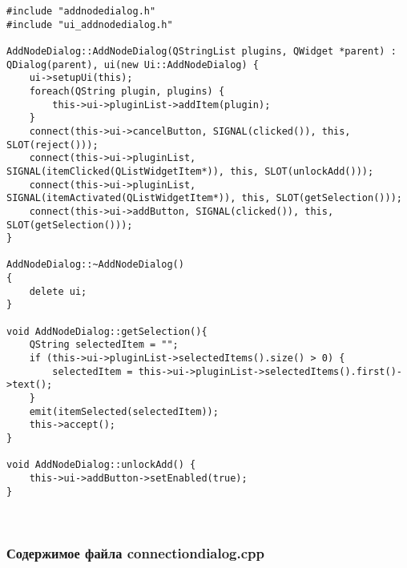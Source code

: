 \begin{lstlisting}
#include "addnodedialog.h"
#include "ui_addnodedialog.h"

AddNodeDialog::AddNodeDialog(QStringList plugins, QWidget *parent) : QDialog(parent), ui(new Ui::AddNodeDialog) {
    ui->setupUi(this);
    foreach(QString plugin, plugins) {
        this->ui->pluginList->addItem(plugin);
    }
    connect(this->ui->cancelButton, SIGNAL(clicked()), this, SLOT(reject()));
    connect(this->ui->pluginList, SIGNAL(itemClicked(QListWidgetItem*)), this, SLOT(unlockAdd()));
    connect(this->ui->pluginList, SIGNAL(itemActivated(QListWidgetItem*)), this, SLOT(getSelection()));
    connect(this->ui->addButton, SIGNAL(clicked()), this, SLOT(getSelection()));
}

AddNodeDialog::~AddNodeDialog()
{
    delete ui;
}

void AddNodeDialog::getSelection(){
    QString selectedItem = "";
    if (this->ui->pluginList->selectedItems().size() > 0) {
        selectedItem = this->ui->pluginList->selectedItems().first()->text();
    }
    emit(itemSelected(selectedItem));
    this->accept();
}

void AddNodeDialog::unlockAdd() {
    this->ui->addButton->setEnabled(true);
}
\end{lstlisting}~\\

\subsubsection*{Содержимое файла connectiondialog.cpp}

